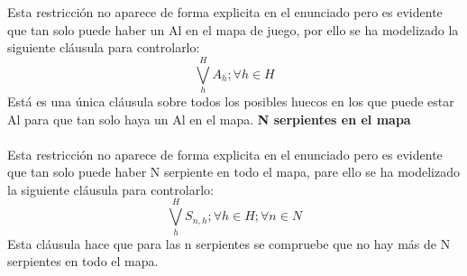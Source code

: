 \documentclass[11pt,spanish]{article}
\begin{document}
			Esta restricción no aparece de forma explicita en el enunciado pero es evidente que tan solo puede haber un Al en el mapa de juego, por ello se ha modelizado la siguiente cláusula para controlarlo:
			\begin{equation*}
				\bigvee\limits_{h}^H A_h; \forall h \in H
			\end{equation*}
			Está es una única cláusula sobre todos los posibles huecos en los que puede estar Al para que tan solo haya un Al en el mapa.
			\textbf{N serpientes en el mapa}\\\\
			Esta restricción no aparece de forma explicita en el enunciado pero es evidente que tan solo puede haber N serpiente en todo el mapa, pare ello se ha modelizado la siguiente cláusula para controlarlo:
			\begin{equation*}
				\bigvee\limits_{h}^H S_{n,h} ;\forall h \in H;\forall n \in N
			\end{equation*}
			Esta cláusula hace que para las n serpientes se compruebe que no hay más de N serpientes en todo el mapa.
		
\end{document}
